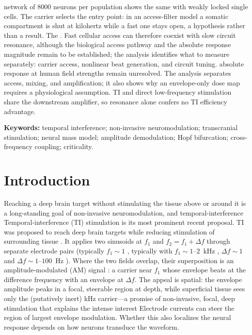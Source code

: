 \documentclass[11pt,a4paper]{article}
\providecommand{\DIFaddtex}[1]{{\protect\color{blue} \sf #1}} %
\providecommand{\DIFdeltex}[1]{{\protect\color{red} \scriptsize #1}} %
\providecommand{\DIFaddbegin}{} %
\providecommand{\DIFaddend}{} %
\providecommand{\DIFdelbegin}{} %
\providecommand{\DIFdelend}{} %
\providecommand{\DIFadd}[1]{\texorpdfstring{\DIFaddtex{#1}}{#1}} %
\providecommand{\DIFdel}[1]{\texorpdfstring{\DIFdeltex{#1}}{}} %
\begin{document}
network of $8000$ neurons per population\DIFdelbegin \DIFdel{shows the same with
weakly locked single cells. The carrier selects the entry point: in an access-filter model a
somatic compartment is shut at kilohertz while a fast one stays open, a hypothesis rather
than a result. The }\DIFdelend \DIFaddbegin \DIFadd{. Fast cellular access can therefore coexist
with slow circuit resonance, although the }\DIFaddend biological access pathway and \DIFdelbegin \DIFdel{the absolute
response magnitude remain to
be established; the analysis identifies what to measure separately: carrier access,
nonlinear beat generation, and circuit tuning. }\DIFdelend \DIFaddbegin \DIFadd{absolute
response at human field strengths remain unresolved. The analysis separates access,
mixing, and amplification; it also shows why an envelope-only dose map requires a
physiological assumption. TI and direct low-frequency stimulation share the downstream
amplifier, so resonance alone confers no TI efficiency advantage.
}\DIFaddend \fi

\smallskip
\noindent\textbf{Keywords:} temporal interference; non-invasive neuromodulation;
transcranial stimulation; neural mass model; amplitude demodulation; Hopf bifurcation;
cross-frequency coupling; criticality.

\clearpage
\tableofcontents
\clearpage

\section{Introduction}
\DIFdelbegin \DIFdel{Reaching a deep brain target without stimulating the tissue above or around it is a long-standing
goal of non-invasive neuromodulation, and temporal-interference }\DIFdelend \DIFaddbegin \DIFadd{Temporal-interference }\DIFaddend (TI) stimulation \DIFdelbegin \DIFdel{\cite{grossman2017} is its most prominent recent proposal. TI }\DIFdelend \DIFaddbegin \DIFadd{was proposed to reach deep brain targets while
reducing stimulation of surrounding tissue \cite{grossman2017}. It }\DIFaddend applies two sinusoids at
$f_1$ and $f_2=f_1+\Delta f$ through separate electrode pairs\DIFdelbegin \DIFdel{(typically $f_1\!\sim\!1$}\DIFdelend \DIFaddbegin \DIFadd{, typically with
$f_1\sim1$}\DIFaddend --$2$~kHz \DIFdelbegin \DIFdel{, $\Delta f\!\sim\!1$}\DIFdelend \DIFaddbegin \DIFadd{and $\Delta f\sim1$}\DIFaddend --$100$~Hz\DIFdelbegin \DIFdel{)}\DIFdelend . Where the \DIFdelbegin \DIFdel{two }\DIFdelend fields overlap, their
superposition is an amplitude-modulated (AM) signal \DIFdelbegin \DIFdel{: a carrier near $f_1$
whose envelope beats at the difference frequency }\DIFdelend \DIFaddbegin \DIFadd{with an envelope at }\DIFaddend $\Delta f$.
\DIFdelbegin \DIFdel{The appeal is
spatial: the envelope amplitude peaks in a focal, steerable region at depth,
while superficial tissue sees only the (putatively inert) kHz carrier---a promise
of non-invasive, focal, deep stimulation that explains the intense interest}\DIFdelend \DIFaddbegin \DIFadd{Electrode currents can steer the region of largest envelope modulation. Whether this
also localizes the neural response depends on how neurons transduce the waveform}\DIFaddend .
\end{document}
